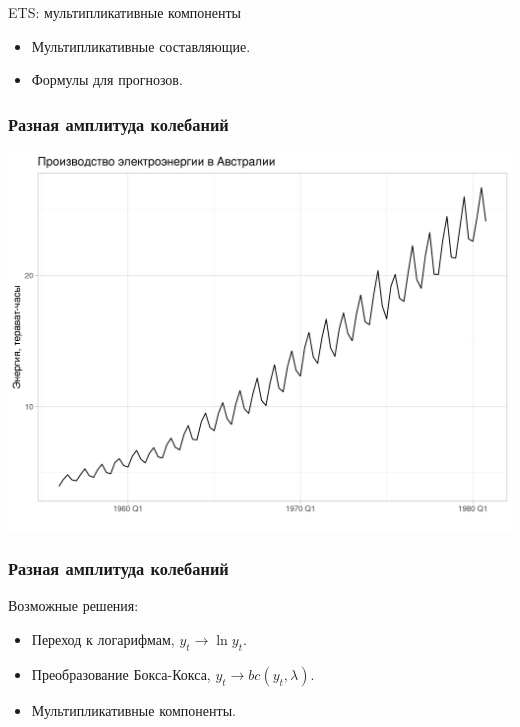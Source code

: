 
\begin{frame} %


\end{frame}



\begin{frame}{ETS: мультипликативные компоненты}
  \begin{itemize}[<+->]
    \item Мультипликативные составляющие.
    \item Формулы для прогнозов.
  \end{itemize}

\end{frame}


\begin{frame}
  \frametitle{Разная амплитуда колебаний}

  \includegraphics[width=\textwidth]{pictures/om_ts_03-033.png}

\end{frame}


\begin{frame}  
  \frametitle{Разная амплитуда колебаний}

  Возможные \alert{решения}:
  \begin{itemize}[<+->]
    \item Переход к логарифмам, $y_t \to \ln y_t$.
    \item Преобразование Бокса-Кокса, $y_t \to bc(y_t, \lambda)$.
    \item Мультипликативные компоненты. 
  \end{itemize}

\end{frame}



